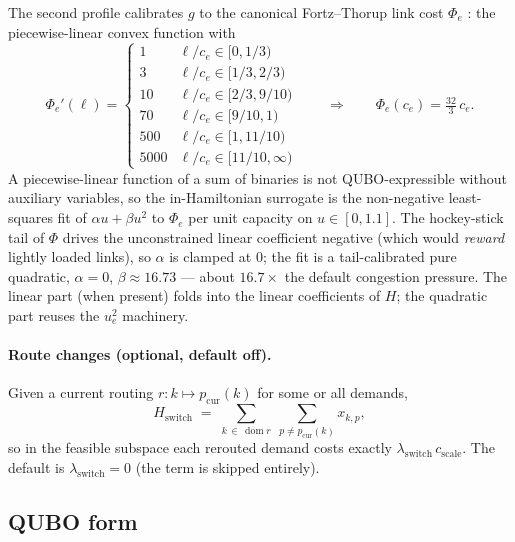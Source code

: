 \documentclass[11pt]{article}
\newcommand{\switch}{\mathrm{switch}}
\begin{document}
The second profile calibrates $g$ to the canonical Fortz--Thorup link cost
$\Phi_e$ \cite{fortz2000}: the piecewise-linear convex function with
\begin{equation}
  \label{eq:phi}
  \Phi_e'(\ell) =
  \begin{cases}
     1    & \ell/c_e \in [0, 1/3)\\
     3    & \ell/c_e \in [1/3, 2/3)\\
     10   & \ell/c_e \in [2/3, 9/10)\\
     70   & \ell/c_e \in [9/10, 1)\\
     500  & \ell/c_e \in [1, 11/10)\\
     5000 & \ell/c_e \in [11/10, \infty)
  \end{cases}
  \qquad\Longrightarrow\qquad
  \Phi_e(c_e) = \tfrac{32}{3}\, c_e .
\end{equation}
A piecewise-linear function of a sum of binaries is not QUBO-expressible
without auxiliary variables, so the in-Hamiltonian surrogate is the
non-negative least-squares fit of $\alpha u + \beta u^2$ to $\Phi_e$ per unit
capacity on $u \in [0, 1.1]$. The hockey-stick tail of $\Phi$ drives the
unconstrained linear coefficient negative (which would \emph{reward} lightly
loaded links), so $\alpha$ is clamped at $0$; the fit is a tail-calibrated
pure quadratic, $\alpha = 0$, $\beta \approx 16.73$ --- about $16.7\times$ the
default congestion pressure. The linear part (when present) folds into the
linear coefficients of $H$; the quadratic part reuses the $u_e^2$ machinery.

\paragraph{Route changes (optional, default off).}
Given a current routing $r : k \mapsto p_{\mathrm{cur}}(k)$ for some or all
demands,
\begin{equation}
  H_{\switch} \;=\; \sum_{k \,\in\, \operatorname{dom} r}\;
      \sum_{p \neq p_{\mathrm{cur}}(k)} x_{k,p},
\end{equation}
so in the feasible subspace each rerouted demand costs exactly
$\lambda_{\switch}\, c_{\mathrm{scale}}$. The default is
$\lambda_{\switch} = 0$ (the term is skipped entirely).

\subsection{QUBO form}
\end{document}
